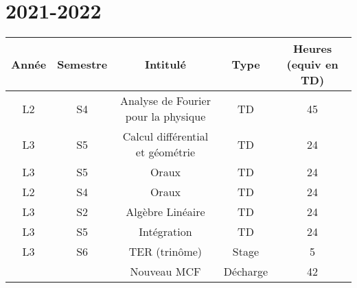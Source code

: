 \documentclass[a4paper, 13pt]{article}
\begin{document}
\section*{2021-2022}
\begin{center}
\begin{tabular}{ |c|c|c|c|c| } 
 \hline
 Année & Semestre & Intitulé & Type & Heures (equiv en TD)\\ \hline
 L2 & S4 & Analyse de Fourier pour la physique & TD & 45\\ 
 L3 & S5 & Calcul différential et géométrie & TD & 24\\
 L3 & S5 & Oraux & TD & 24\\
  L2 & S4 & Oraux & TD & 24 \\
 L3 & S2 & Algèbre Linéaire & TD & 24\\
 L3 & S5 & Intégration & TD & 24\\
 L3 & S6 & TER (trinôme) & Stage & 5\\
  &  & Nouveau MCF & Décharge & 42 \\  
   \hline
\end{tabular}
\end{center}
\end{document}
